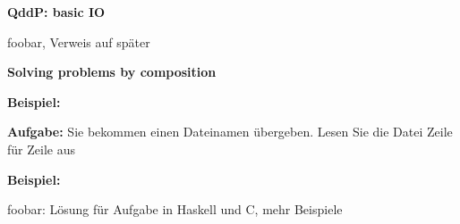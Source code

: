 \documentclass[unknownkeysallowed]{beamer}
\begin{document}
  
  \begin{frame}[fragile]

    \begin{center}
    \Large\textbf{QddP: basic IO}\\\bigskip

foobar, Verweis auf später

    \end{center}
\end{frame}


  
  \begin{frame}

    \begin{center}
    \Large\textbf{Solving problems by composition}
    \end{center}
  \end{frame}
  
  
  \begin{frame}

    \begin{center}
    \Large\textbf{Beispiel:}\bigskip
    
    \textbf{Aufgabe:} Sie bekommen einen Dateinamen übergeben. Lesen Sie die Datei Zeile für Zeile aus
    \end{center}
  \end{frame}
  
  
  \begin{frame}[fragile]

    \begin{center}
    \Large\textbf{Beispiel:}\\\bigskip

foobar: Lösung für Aufgabe in Haskell und C, mehr Beispiele

    \end{center}
\end{frame}
  
\end{document}

